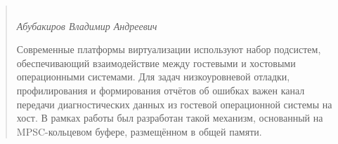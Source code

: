 \begin{abstract}

    \begin{center}
        \large{} \\
    \large\textit{Абубакиров Владимир Андреевич} \\[1 cm]

    \end{center}

    Современные платформы виртуализации используют набор подсистем, 
    обеспечивающий взаимодействие между гостевыми и хостовыми операционными 
    системами. Для задач низкоуровневой отладки, профилирования и 
    формирования отчётов об ошибках важен канал передачи диагностических данных
    из гостевой операционной системы на хост. В рамках работы был разработан
    такой механизм, основанный на MPSC-кольцевом буфере, размещённом в общей
    памяти.

    \vfill



\end{abstract}
